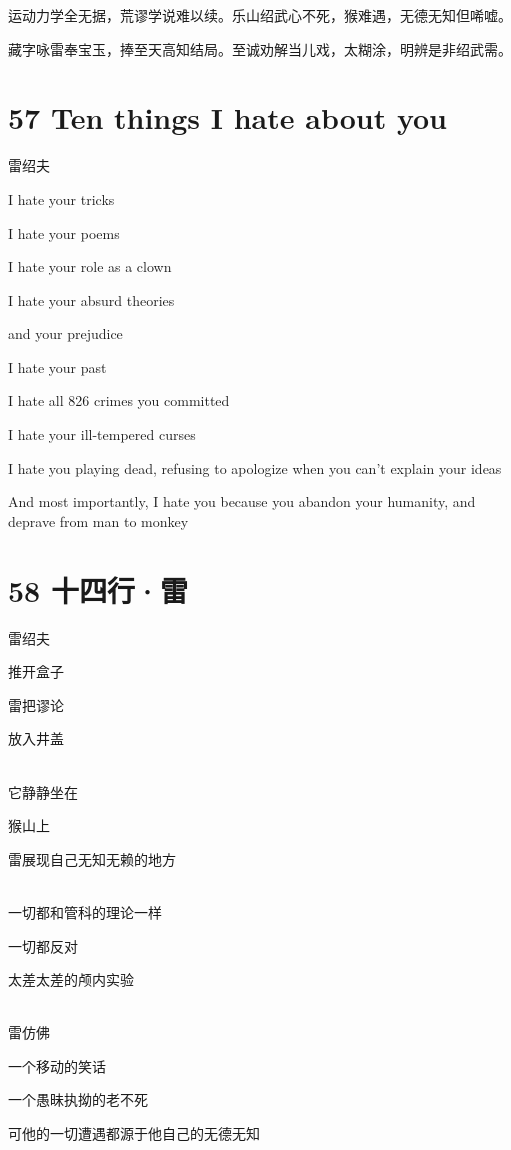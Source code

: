\documentclass[UTF8,12pt,oneside]{ctexbook}
\begin{document}
        运动力学全无据，荒谬学说难以续。乐山绍武心不死，猴难遇，无德无知但唏嘘。
        
        藏字咏雷奉宝玉，捧至天高知结局。至诚劝解当儿戏，太糊涂，明辨是非绍武需。
        
        \section{57 Ten things I hate about you}
        \begin{center}
            雷绍夫
        \end{center}
        
        I hate your tricks
        
        I hate your poems
        
        I hate your role as a clown
        
        I hate your absurd theories
        
        and your prejudice
        
        I hate your past
        
        I hate all 826 crimes you committed
        
        I hate your ill-tempered curses
        
        I hate you playing dead, refusing to apologize when you can't explain your ideas
        
        And most importantly, I hate you because you abandon your humanity, and deprave from man to monkey
        
        \section{58 十四行·雷}
        \begin{center}
            雷绍夫
        \end{center}
        
        \begin{center}
        推开盒子
        
        雷把谬论
        
        放入井盖
        
        ~\\
        它静静坐在
        
        猴山上
        
        雷展现自己无知无赖的地方
        
        ~\\
        一切都和管科的理论一样
        
        一切都反对
        
        太差太差的颅内实验
        
        \newpage
        
        ~\\
        雷仿佛
        
        一个移动的笑话
        
        一个愚昧执拗的老不死
        
        可他的一切遭遇都源于他自己的无德无知
        \end{center}
        
\end{document}
